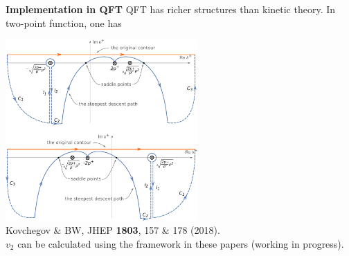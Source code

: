 \documentclass[9pt,a4paper,unknownkeysallowed,xcolor=dvipsnames,aspectratio=43]{beamer}
\begin{document}
\begin{frame}{\bf\huge Implementation in QFT}
\setcounter{page}{0}
{\color{darkred}QFT has richer structures than kinetic theory. In two-point function, one has}
\begin{center}
\includegraphics[width=0.55\textwidth]{fig/GXpLO}\\
\vspace{4mm}
{\tiny  {\color{teablue} Kovchegov \& BW,
    JHEP {\bf 1803}, 157 \& 178 (2018).
  }
  }\\
  \vspace{2mm}
  {\color{darkred} $v_2$ can be calculated using the framework in these papers (working in progress).}
\end{center}
\end{frame}
\end{document}
